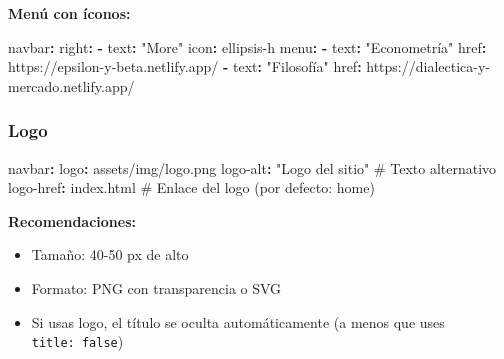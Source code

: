 \documentclass[
  doc,
  floatsintext,
  longtable,
  a4paper,
  nolmodern,
  notxfonts,
  notimes,
  12pt,
  colorlinks=true,linkcolor=blue,citecolor=blue,urlcolor=blue]{apa7}
\newenvironment{Shaded}{\begin{snugshade}}{\end{snugshade}}
\newcommand{\AttributeTok}[1]{\textcolor[rgb]{0.40,0.45,0.13}{#1}}
\newcommand{\CommentTok}[1]{\textcolor[rgb]{0.37,0.37,0.37}{#1}}
\newcommand{\FunctionTok}[1]{\textcolor[rgb]{0.28,0.35,0.67}{#1}}
\newcommand{\KeywordTok}[1]{\textcolor[rgb]{0.00,0.23,0.31}{\textbf{#1}}}
\newcommand{\StringTok}[1]{\textcolor[rgb]{0.13,0.47,0.30}{#1}}
\providecommand{\tightlist}{%
  \setlength{\itemsep}{0pt}\setlength{\parskip}{0pt}}
\begin{document}
\textbf{Menú con íconos:}

\begin{Shaded}
\begin{Highlighting}[]
\FunctionTok{navbar}\KeywordTok{:}
\AttributeTok{  }\FunctionTok{right}\KeywordTok{:}
\AttributeTok{    }\KeywordTok{{-}}\AttributeTok{ }\FunctionTok{text}\KeywordTok{:}\AttributeTok{ }\StringTok{"More"}
\AttributeTok{      }\FunctionTok{icon}\KeywordTok{:}\AttributeTok{ ellipsis{-}h}
\AttributeTok{      }\FunctionTok{menu}\KeywordTok{:}
\AttributeTok{        }\KeywordTok{{-}}\AttributeTok{ }\FunctionTok{text}\KeywordTok{:}\AttributeTok{ }\StringTok{"Econometría"}
\AttributeTok{          }\FunctionTok{href}\KeywordTok{:}\AttributeTok{ https://epsilon{-}y{-}beta.netlify.app/}
\AttributeTok{        }\KeywordTok{{-}}\AttributeTok{ }\FunctionTok{text}\KeywordTok{:}\AttributeTok{ }\StringTok{"Filosofía"}
\AttributeTok{          }\FunctionTok{href}\KeywordTok{:}\AttributeTok{ https://dialectica{-}y{-}mercado.netlify.app/}
\end{Highlighting}
\end{Shaded}

\subsubsection{Logo}\label{logo}

\begin{Shaded}
\begin{Highlighting}[]
\FunctionTok{navbar}\KeywordTok{:}
\AttributeTok{  }\FunctionTok{logo}\KeywordTok{:}\AttributeTok{ assets/img/logo.png}
\AttributeTok{  }\FunctionTok{logo{-}alt}\KeywordTok{:}\AttributeTok{ }\StringTok{"Logo del sitio"}\CommentTok{        \# Texto alternativo}
\AttributeTok{  }\FunctionTok{logo{-}href}\KeywordTok{:}\AttributeTok{ index.html}\CommentTok{              \# Enlace del logo (por defecto: home)}
\end{Highlighting}
\end{Shaded}

\textbf{Recomendaciones:}

\begin{itemize}
\tightlist
\item
  Tamaño: 40-50 px de alto
\item
  Formato: PNG con transparencia o SVG
\item
  Si usas logo, el título se oculta automáticamente (a menos que uses
  \texttt{title:\ false})
\end{itemize}
\end{document}
